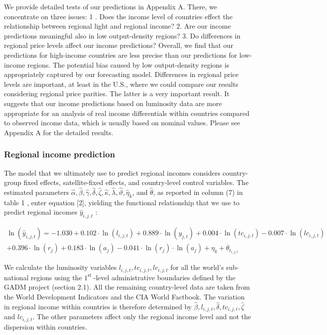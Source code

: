 \documentclass[10pt]{article}
\begin{document}
We provide detailed tests of our predictions in Appendix A. There, we concentrate on three issues: 1 . Does the income level of countries effect the relationship between regional light and regional income? 2. Are our income predictions meaningful also in low output-density regions? 3. Do differences in regional price levels affect our income predictions? Overall, we find that our predictions for high-income countries are less precise than our predictions for low-income regions. The potential bias caused by low output-density regions is appropriately captured by our forecasting model. Differences in regional price levels are important, at least in the U.S., where we could compare our results considering regional price parities. The latter is a very important result. It suggests that our income predictions based on luminosity data are more appropriate for an analysis of real income differentials within countries compared to observed income data, which is usually based on nominal values. Please see Appendix A for the detailed results.

\subsubsection{Regional income prediction}
The model that we ultimately use to predict regional incomes considers country-group fixed effects, satellite-fixed effects, and country-level control variables. The estimated parameters $\hat{\alpha}, \hat{\beta}, \hat{\gamma}, \hat{\delta}, \hat{\zeta}, \hat{\kappa}, \hat{\lambda}, \hat{\vartheta}, \hat{\eta}_{k}$, and $\hat{\theta}$, as reported in column (7) in table 1 , enter equation [2], yielding the functional relationship that we use to predict regional incomes $\hat{y}_{i, j, t}$ :

$$
\begin{array}{r}
\ln \left(\hat{y}_{i, j, t}\right)=-1.030+0.102 \cdot \ln \left(l_{i, j, t}\right)+0.889 \cdot \ln \left(y_{j, t}\right)+0.004 \cdot \ln \left(t c_{i, j, t}\right)-0.007 \cdot \ln \left(l c_{i, j, t}\right) \\
+0.396 \cdot \ln \left(r_{j}\right)+0.183 \cdot \ln \left(a_{j}\right)-0.041 \cdot \ln \left(r_{j}\right) \cdot \ln \left(a_{j}\right)+\eta_{k}+\theta_{t_{i, j, t}}
\end{array}
$$

We calculate the luminosity variables $l_{i, j, t}, t c_{i, j, t}, l c_{i, j, t}$ for all the world's sub-national regions using the $1^{\text {st }}$-level administrative boundaries defined by the GADM project (section 2.1). All the remaining country-level data are taken from the World Development Indicators and the CIA World Factbook. The variation in regional income within countries is therefore determined by $\hat{\beta}, l_{i, j, t}, \hat{\delta}, t c_{i, j, t}, \hat{\zeta}$ and $l c_{i, j, t}$. The other parameters affect only the regional income level and not the dispersion within countries.
\end{document}
